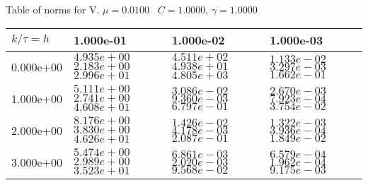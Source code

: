 \begin{center}
Table of norms for V. $\mu = 0.0100$ \, $C = 1.0000$, $\gamma = 1.0000$
  
\begin{tabular}{|p{1in}|p{1in}|p{1in}|p{1in}|} \hline
$k / \tau = h$ &1.000e-01 &1.000e-02 &1.000e-03 \\ \hline 
0.000e+00 & $4.935e+00$  $2.183e+00$  $2.996e+01$  & $4.511e+02$  $4.938e+01$  $4.805e+03$  & $1.133e-02$  $3.297e-03$  $1.662e-01$  \\ \hline 
1.000e+00 & $5.111e+00$  $2.741e+00$  $4.608e+01$  & $3.086e-02$  $9.360e-03$  $6.797e-01$  & $2.670e-03$  $7.923e-04$  $3.754e-02$  \\ \hline 
2.000e+00 & $8.176e+00$  $3.830e+00$  $4.626e+01$  & $1.426e-02$  $4.178e-03$  $2.087e-01$  & $1.322e-03$  $3.936e-04$  $1.849e-02$  \\ \hline 
3.000e+00 & $5.474e+00$  $2.989e+00$  $3.523e+01$  & $6.861e-03$  $2.020e-03$  $9.568e-02$  & $6.579e-04$  $1.962e-04$  $9.175e-03$  \\ \hline 

\end{tabular}\\[20pt]
\end{center}
